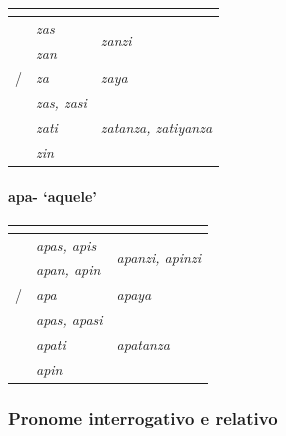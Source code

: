 \begin{center}
	\begin{tabular}[c]{lll}
		\toprule
		                 & \Sg{}\emph{}     & \Pl{}\emph{}                    \\
		\midrule
		\Nom{} \Com{}    & \emph{zas}       & \multirow{2}{4em}{\emph{zanzi}} \\
		\Acu{} \Com{}    & \emph{zan}       &                                 \\
		\Nom/\Acu\Neut{} & \emph{za}        & \emph{zaya}                     \\
		\Gen{}           & \emph{zas, zasi} &                                 \\
		\Dat{}           & \emph{zati}      & \emph{zatanza, zatiyanza}       \\
		\Abl{}           & \emph{zin}       & \emph{}                         \\
		\bottomrule
	\end{tabular}
\end{center}

\paragraph{apa- `aquele'}

\begin{center}
	\begin{tabular}[c]{lll}
		\toprule
		                 & \Sg{}\emph{}       & \Pl{}\emph{}                             \\
		\midrule
		\Nom{} \Com{}    & \emph{apas, apis}  & \multirow{2}{4em}{\emph{apanzi, apinzi}} \\
		\Acu{} \Com{}    & \emph{apan, apin}  &                                          \\
		\Nom/\Acu\Neut{} & \emph{apa}         & \emph{apaya}                             \\
		\Gen{}           & \emph{apas, apasi} &                                          \\
		\Dat{}           & \emph{apati}       & \emph{apatanza}                          \\
		\Abl{}           & \emph{apin}        & \emph{}                                  \\
		\bottomrule
	\end{tabular}
\end{center}

\subsubsection{Pronome interrogativo e relativo}

